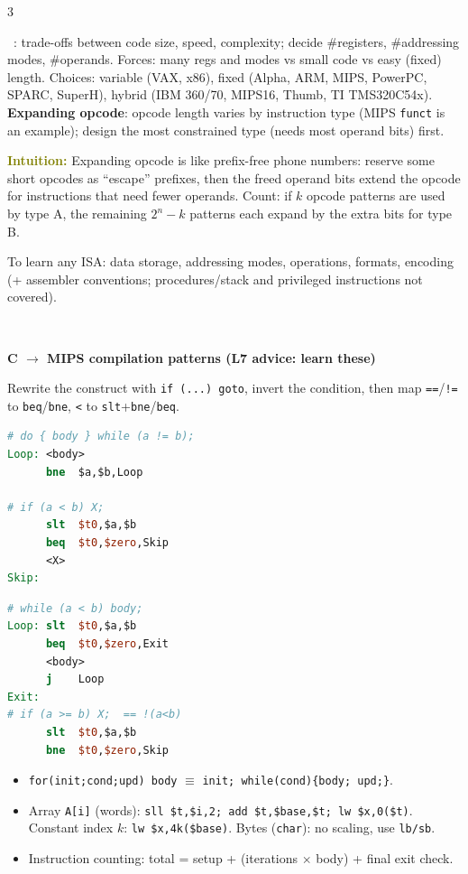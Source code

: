 \documentclass[landscape]{article}
\newcommand{\sect}[1]{\par\vspace{2pt}\noindent{\color{cur}\rule[-1.5pt]{\linewidth}{0.4pt}}\\[-7.5pt]%
  \noindent\colorbox{cur!12}{\parbox{\dimexpr\linewidth-2\fboxsep}{\color{cur}\bfseries #1}}\par\vspace{0.5pt}}
\newcommand{\sub}[1]{\par\vspace{1pt}{\color{cur}\bfseries #1}\ }
\newcommand{\key}[1]{\textbf{\color{BrickRed}#1}}
\newcommand{\idea}[1]{\par\noindent\colorbox{yellow!25}{\parbox{\dimexpr\linewidth-2\fboxsep}{\textcolor{olive}{\textbf{Intuition:} }#1}}\par}
\newcommand{\tc}[1]{\texttt{#1}}
\newlength{\fu}\setlength{\fu}{5.4pt}
\begin{document}
\begin{multicols*}{3}
\sub{\#5 Encoding}: trade-offs between code size, speed, complexity; decide \#registers, \#addressing modes, \#operands. Forces: many regs and modes vs small code vs easy (fixed) length. Choices: variable (VAX, x86), fixed (Alpha, ARM, MIPS, PowerPC, SPARC, SuperH), hybrid (IBM 360/70, MIPS16, Thumb, TI TMS320C54x).\\
\key{Expanding opcode}: opcode length varies by instruction type (MIPS \tc{funct} is an example); design the most constrained type (needs most operand bits) first.\\
\idea{Expanding opcode is like prefix-free phone numbers: reserve some short opcodes as ``escape'' prefixes, then the freed operand bits extend the opcode for instructions that need fewer operands. Count: if $k$ opcode patterns are used by type A, the remaining $2^n-k$ patterns each expand by the extra bits for type B.}
To learn any ISA: data storage, addressing modes, operations, formats, encoding (+ assembler conventions; procedures/stack and privileged instructions not covered).

\sect{C $\to$ MIPS compilation patterns (L7 advice: learn these)}
Rewrite the construct with \tc{if (...) goto}, invert the condition, then map \tc{==}/\tc{!=} to \tc{beq}/\tc{bne}, \tc{<} to \tc{slt}+\tc{bne}/\tc{beq}.\\
\begin{minipage}[t]{0.5\linewidth}
\begin{lstlisting}[language=mips]
# do { body } while (a != b);
Loop: <body>
      bne  $a,$b,Loop

# if (a < b) X;
      slt  $t0,$a,$b
      beq  $t0,$zero,Skip
      <X>
Skip:
\end{lstlisting}
\end{minipage}\hfill
\begin{minipage}[t]{0.48\linewidth}
\begin{lstlisting}[language=mips]
# while (a < b) body;
Loop: slt  $t0,$a,$b
      beq  $t0,$zero,Exit
      <body>
      j    Loop
Exit:
# if (a >= b) X;  == !(a<b)
      slt  $t0,$a,$b
      bne  $t0,$zero,Skip
\end{lstlisting}
\end{minipage}
\begin{itemize}
\item \tc{for(init;cond;upd) body} $\equiv$ \tc{init; while(cond)\{body; upd;\}}.
\item Array \tc{A[i]} (words): \tc{sll \$t,\$i,2; add \$t,\$base,\$t; lw \$x,0(\$t)}. Constant index $k$: \tc{lw \$x,4k(\$base)}. Bytes (\tc{char}): no scaling, use \tc{lb/sb}.
\item Instruction counting: total = setup + (iterations $\times$ body) + final exit check.
\end{itemize}


\end{multicols*}
\end{document}
